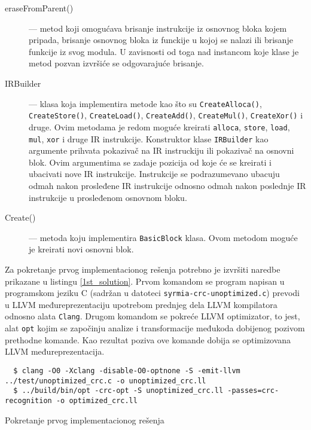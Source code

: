 \documentclass[12pt,oneside]{memoir}
\begin{document}
\begin{description}
  
  \item[eraseFromParent()] --- metod koji omogućava brisanje instrukcije iz osnovnog bloka kojem pripada, brisanje osnovnog bloka iz funckije u kojoj se nalazi ili brisanje funkcije iz svog modula. U zavisnosti od toga nad instancom koje klase je metod pozvan izvršiće se odgovarajuće brisanje. 

  \item[IRBuilder] --- klasa koja implementira metode kao što su \texttt{CreateAlloca()}, \texttt{CreateStore()}, \texttt{CreateLoad()}, \texttt{CreateAdd()}, \texttt{CreateMul()}, \texttt{CreateXor()} i druge. Ovim metodama je redom moguće kreirati \texttt{alloca}, \texttt{store}, \texttt{load}, \texttt{mul}, \texttt{xor} i druge IR instrukcije. Konstruktor klase \texttt{IRBuilder} kao argumente prihvata pokazivač na IR instruckiju ili pokazivač na osnovni blok. Ovim argumentima se zadaje pozicija od koje će se kreirati i ubacivati nove IR instrukcije. Instrukcije se podrazumevano ubacuju odmah nakon prosleđene IR instrukcije odnosno odmah nakon poslednje IR instrukcije u prosleđenom osnovnom bloku.
  
  \item[Create()] --- metoda koju implementira \texttt{BasicBlock} klasa. Ovom metodom moguće je kreirati novi osnovni blok. 
  
\end{description}

Za pokretanje prvog implementacionog rešenja potrebno je izvršiti naredbe prikazane u listingu \ref{1st_solution}.
Prvom komandom se program napisan u programskom jeziku C (sadržan u datoteci 
\texttt{syrmia-crc-unoptimized.c}) prevodi u LLVM međureprezentaciju upotrebom prednjeg dela LLVM kompilatora odnosno alata \texttt{Clang}. Drugom komandom se pokreće LLVM optimizator, to jest, alat \texttt{opt} kojim se započinju analize i transformacije međukoda dobijenog pozivom prethodne komande. Kao rezultat poziva ove komande dobija se optimizovana LLVM međureprezentacija. 

\begin{listing}[!ht]
\begin{verbatim}
  $ clang -O0 -Xclang -disable-O0-optnone -S -emit-llvm ../test/unoptimized_crc.c -o unoptimized_crc.ll
  $ ../build/bin/opt -crc-opt -S unoptimized_crc.ll -passes=crc-recognition -o optimized_crc.ll
\end{verbatim}
\caption{Pokretanje prvog implementacionog rešenja} 
\label{1st_solution}
\end{listing}
\end{document}
